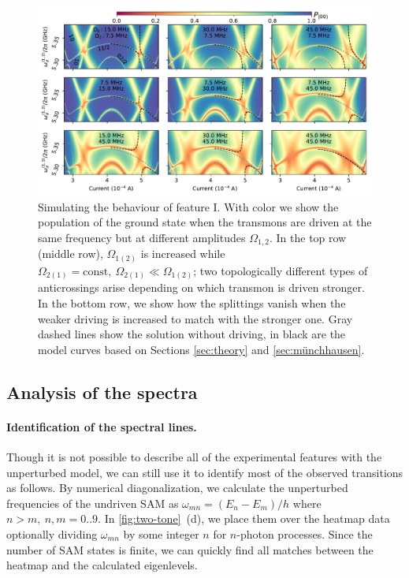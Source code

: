 \documentclass[%
 aps, prx,
 amsmath,amssymb,
 reprint,%
superscriptaddress
]{revtex4-2}
\begin{document}
\begin{figure}
	\centering
	\includegraphics[width=\linewidth]{topological_splittings}
	\caption{Simulating the behaviour of feature I. With color we show the population of the ground 
	state when the transmons are driven at the 
	same frequency but at different amplitudes 
	$\Omega_{1,2}$. In the top row (middle row), 
	$\Omega_{1(2)}$ is increased while 
	$\Omega_{2(1)} = \text{const},\ \Omega_{2(1)} \ll 
	\Omega_{1(2)}$; two topologically different 
	types of anticrossings arise depending on 
	which transmon is driven stronger. In the 
	bottom row, we show how the splittings vanish 
	when the weaker driving is increased to match 
	with the stronger one. Gray dashed lines show 
	the solution without driving, in black are 
	the model curves based on Sections 
	\ref{sec:theory} and \ref{sec:münchhausen}.}
	\label{fig:difdrive}
\end{figure}


\subsection{Analysis of the spectra} 
\label{sec:analysis}

\paragraph{Identification of the spectral lines.} 
Though it is not possible to describe all of the 
experimental features with the unperturbed model, 
we can still use it to identify most of the 
observed transitions as follows. By numerical diagonalization, we calculate the 
unperturbed frequencies of the undriven SAM as 
$\omega_{mn} = (E_n - E_m)/h$ where $n>m,\  
n,m=0..9$. In \autoref{fig:two-tone}~(d), we 
place them over the heatmap data optionally dividing 
$\omega_{mn}$ by some integer $n$ for $n$-photon processes. 
Since the number of SAM states is finite, we can 
quickly find all matches between the heatmap and the calculated eigenlevels. 
\end{document}
